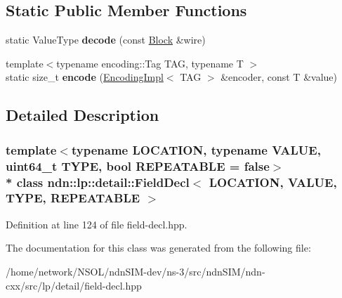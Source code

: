 \subsection*{Static Public Member Functions}
\begin{DoxyCompactItemize}
\item 
static Value\+Type {\bfseries decode} (const \hyperlink{classndn_1_1Block}{Block} \&wire)\hypertarget{classndn_1_1lp_1_1detail_1_1FieldDecl_a169017e7e65921773afae9251e06dc91}{}\label{classndn_1_1lp_1_1detail_1_1FieldDecl_a169017e7e65921773afae9251e06dc91}

\item 
{\footnotesize template$<$typename encoding\+::\+Tag T\+AG, typename T $>$ }\\static size\+\_\+t {\bfseries encode} (\hyperlink{classndn_1_1encoding_1_1EncodingImpl}{Encoding\+Impl}$<$ T\+AG $>$ \&encoder, const T \&value)\hypertarget{classndn_1_1lp_1_1detail_1_1FieldDecl_a5dec018ad2121e09948d58d3d8b3a479}{}\label{classndn_1_1lp_1_1detail_1_1FieldDecl_a5dec018ad2121e09948d58d3d8b3a479}

\end{DoxyCompactItemize}


\subsection{Detailed Description}
\subsubsection*{template$<$typename L\+O\+C\+A\+T\+I\+ON, typename V\+A\+L\+UE, uint64\+\_\+t T\+Y\+PE, bool R\+E\+P\+E\+A\+T\+A\+B\+LE = false$>$\\*
class ndn\+::lp\+::detail\+::\+Field\+Decl$<$ L\+O\+C\+A\+T\+I\+O\+N, V\+A\+L\+U\+E, T\+Y\+P\+E, R\+E\+P\+E\+A\+T\+A\+B\+L\+E $>$}



Definition at line 124 of file field-\/decl.\+hpp.



The documentation for this class was generated from the following file\+:\begin{DoxyCompactItemize}
\item 
/home/network/\+N\+S\+O\+L/ndn\+S\+I\+M-\/dev/ns-\/3/src/ndn\+S\+I\+M/ndn-\/cxx/src/lp/detail/field-\/decl.\+hpp\end{DoxyCompactItemize}
